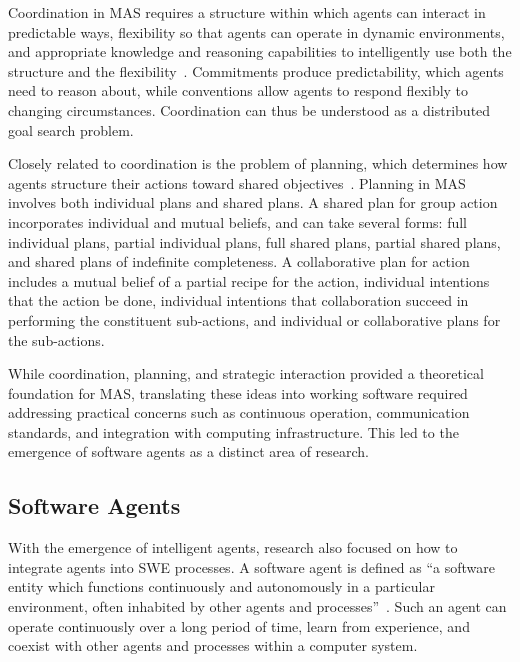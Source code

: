 \documentclass[
english,                 %
bibtex,                  %
includeExtraAbstracts, %
]{kththesis}
\numberwithin{listing}{chapter}
\begin{document}
Coordination in \gls{MAS} requires a structure within which agents can interact in predictable ways, flexibility so that agents can operate in dynamic environments, and appropriate knowledge and reasoning capabilities to intelligently use both the structure and the flexibility~\cite{jennings_commitments_1993}. Commitments produce predictability, which agents need to reason about, while conventions allow agents to respond flexibly to changing circumstances. Coordination can thus be understood as a distributed goal search problem.

Closely related to coordination is the problem of planning, which determines how agents structure their actions toward shared objectives~\cite{grosz_collaborative_1996}. Planning in \gls{MAS} involves both individual plans and shared plans. A shared plan for group action incorporates individual and mutual beliefs, and can take several forms: full individual plans, partial individual plans, full shared plans, partial shared plans, and shared plans of indefinite completeness. A collaborative plan for action includes a mutual belief of a partial recipe for the action, individual intentions that the action be done, individual intentions that collaboration succeed in performing the constituent sub-actions, and individual or collaborative plans for the sub-actions.

While coordination, planning, and strategic interaction provided a theoretical foundation for \gls{MAS}, translating these ideas into working software required addressing practical concerns such as continuous operation, communication standards, and integration with computing infrastructure. This led to the emergence of software agents as a distinct area of research.

\subsection{Software Agents}

With the emergence of intelligent agents, research also focused on how to integrate agents into \gls{SWE} processes. A software agent is defined as ``a software entity which functions continuously and autonomously in a particular environment, often inhabited by other agents and processes''~\cite{bradshaw_introduction_1997}. Such an agent can operate continuously over a long period of time, learn from experience, and coexist with other agents and processes within a computer system.
\end{document}
